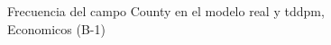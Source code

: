 \begin{figure}[H]
    \centering
    
    \caption{Frecuencia del campo County en el modelo real y tddpm, Economicos (B-1)}
    \label{frecuency-County-tddpm_mlp}
\end{figure}